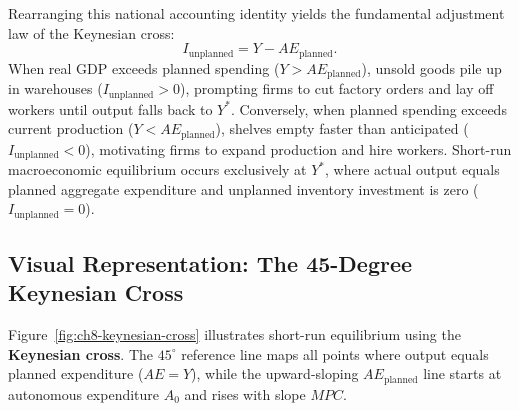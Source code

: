 \documentclass[11pt,letterpaper]{article}
\begin{document}
Rearranging this national accounting identity yields the fundamental adjustment law of the Keynesian cross:
\begin{equation}
I_{\text{unplanned}} = Y - AE_{\text{planned}}.
\end{equation}
When real GDP exceeds planned spending ($Y > AE_{\text{planned}}$), unsold goods pile up in warehouses ($I_{\text{unplanned}} > 0$), prompting firms to cut factory orders and lay off workers until output falls back to $Y^*$. Conversely, when planned spending exceeds current production ($Y < AE_{\text{planned}}$), shelves empty faster than anticipated ($I_{\text{unplanned}} < 0$), motivating firms to expand production and hire workers. Short-run macroeconomic equilibrium occurs exclusively at $Y^*$, where actual output equals planned aggregate expenditure and unplanned inventory investment is zero ($I_{\text{unplanned}} = 0$).

\subsection*{Visual Representation: The 45-Degree Keynesian Cross}
Figure~\ref{fig:ch8-keynesian-cross} illustrates short-run equilibrium using the \textbf{Keynesian cross}. The $45^\circ$ reference line maps all points where output equals planned expenditure ($AE = Y$), while the upward-sloping $AE_{\text{planned}}$ line starts at autonomous expenditure $A_0$ and rises with slope $MPC$.
\end{document}
